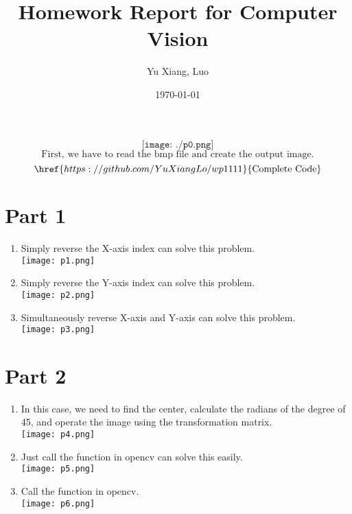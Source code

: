 \documentclass[12pt,a4paper]{article}
\title{Homework Report for Computer Vision}
\author{Yu Xiang, Luo}
\date{\today}
\begin{document}
\maketitle

\[
	\texttt{[image: ./p0.png]}
\]
\[
	\text{First, we have to read the bmp file and create the output image.}
\]
\[
	\href{https://github.com/YuXiangLo/wp1111}{\text{Complete Code}}
\]
\section*{Part 1}
\begin{enumerate}[label=(\alph*)]
	\item Simply reverse the X-axis index can solve this problem.\\ 
		\texttt{[image: p1.png]}
	\item Simply reverse the Y-axis index can solve this problem.\\
		\texttt{[image: p2.png]}
	\item Simultaneously reverse X-axis and Y-axis can solve this problem.\\
		\texttt{[image: p3.png]}
\end{enumerate}

\section*{Part 2}
\begin{enumerate}[label=(\alph*), resume]
	\item In this case, we need to find the center, calculate the radians of the degree of 45, and operate the image using the transformation matrix.\\
	\texttt{[image: p4.png]}
	\item Just call the function in opencv can solve this easily.\\
		\texttt{[image: p5.png]}
	\item Call the function in opencv.\\
		\texttt{[image: p6.png]}
\end{enumerate}
\end{document}
